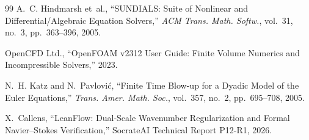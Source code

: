 \documentclass[10pt,twocolumn]{article}
\begin{document}
\small
\begin{thebibliography}{99}
A.~C. Hindmarsh et~al., ``SUNDIALS: Suite of Nonlinear and Differential/Algebraic Equation Solvers,'' \emph{ACM Trans. Math. Softw.}, vol.~31, no.~3, pp.~363--396, 2005.

OpenCFD Ltd., ``OpenFOAM v2312 User Guide: Finite Volume Numerics and Incompressible Solvers,'' 2023.

N.~H. Katz and N.~Pavlovi{\'c}, ``Finite Time Blow-up for a Dyadic Model of the Euler Equations,'' \emph{Trans. Amer. Math. Soc.}, vol.~357, no.~2, pp.~695--708, 2005.

X.~Callens, ``LeanFlow: Dual-Scale Wavenumber Regularization and Formal Navier--Stokes Verification,'' SocrateAI Technical Report P12-R1, 2026.
\end{thebibliography}
\end{document}

